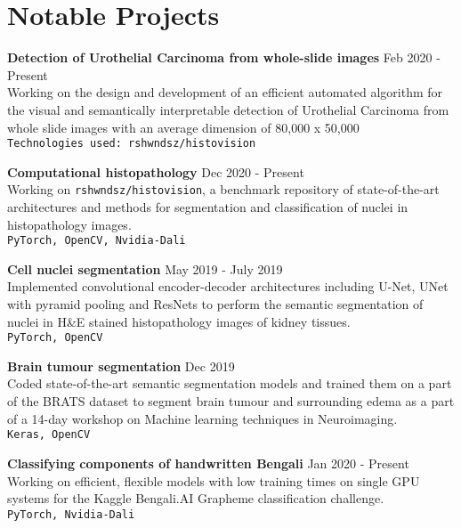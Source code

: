 \documentclass[letterpaper]{article}
\renewenvironment{itemize}{
  \begin{list}{}{
    \setlength{\leftmargin}{1.5em}
  }
}{
  \end{list}
}
\newcommand{\smallGreyFont}[1]{\textcolor{black!80}{\small{#1}}}
\begin{document}
\section*{Notable Projects}
  \begin{itemize}
  \item
    \textbf{Detection of Urothelial Carcinoma from whole-slide images}
    \hfill{\smallGreyFont{Feb 2020 - Present}}\\
      Working on the design and development of an efficient automated algorithm for the  visual and semantically interpretable detection of Urothelial Carcinoma from whole slide images with an average dimension of 80,000 x 50,000 \\
      \texttt{\smallGreyFont{Technologies used: rshwndsz/histovision}}

    \item
    \textbf{Computational histopathology}
    \hfill{\smallGreyFont{Dec 2020 - Present}}\\
      Working on \texttt{rshwndsz/histovision}, a benchmark repository of state-of-the-art architectures and methods for segmentation and classification of nuclei in histopathology images.\\
      \texttt{\smallGreyFont{PyTorch, OpenCV, Nvidia-Dali}}

    \item
    \textbf{Cell nuclei segmentation}
    \hfill{\smallGreyFont{May 2019 - July 2019}}\\
      Implemented convolutional encoder-decoder architectures including U-Net, UNet with pyramid pooling and ResNets to perform the semantic segmentation of nuclei in H\&E stained histopathology images of kidney tissues.\\
      \texttt{\smallGreyFont{PyTorch, OpenCV}}

    \item
    \textbf{Brain tumour segmentation}
    \hfill{\smallGreyFont{Dec 2019}}\\
       Coded state-of-the-art semantic segmentation models and trained them on a part of the BRATS dataset to segment brain tumour and surrounding edema as a part of a 14-day workshop on Machine learning techniques in Neuroimaging.\\
       \texttt{\smallGreyFont{Keras, OpenCV}}

    \item
    \textbf{Classifying components of handwritten Bengali}
    \hfill{\smallGreyFont{Jan 2020 - Present}}\\
      Working on efficient, flexible models with low training times on single GPU systems for the Kaggle Bengali.AI Grapheme classification challenge.\\
      \texttt{\smallGreyFont{PyTorch, Nvidia-Dali}}


\end{itemize}
\end{document}
